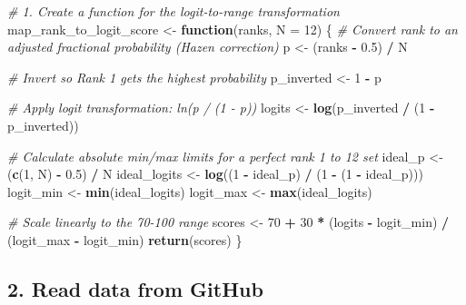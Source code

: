 \documentclass[
]{article}
\newenvironment{Shaded}{\begin{snugshade}}{\end{snugshade}}
\newcommand{\AttributeTok}[1]{\textcolor[rgb]{0.13,0.29,0.53}{#1}}
\newcommand{\CommentTok}[1]{\textcolor[rgb]{0.56,0.35,0.01}{\textit{#1}}}
\newcommand{\ControlFlowTok}[1]{\textcolor[rgb]{0.13,0.29,0.53}{\textbf{#1}}}
\newcommand{\DecValTok}[1]{\textcolor[rgb]{0.00,0.00,0.81}{#1}}
\newcommand{\FloatTok}[1]{\textcolor[rgb]{0.00,0.00,0.81}{#1}}
\newcommand{\FunctionTok}[1]{\textcolor[rgb]{0.13,0.29,0.53}{\textbf{#1}}}
\newcommand{\NormalTok}[1]{#1}
\newcommand{\OtherTok}[1]{\textcolor[rgb]{0.56,0.35,0.01}{#1}}
\newcommand{\SpecialCharTok}[1]{\textcolor[rgb]{0.81,0.36,0.00}{\textbf{#1}}}
\begin{document}
\begin{Shaded}
\begin{Highlighting}[]
\CommentTok{\# 1. Create a function for the logit{-}to{-}range transformation}
\NormalTok{map\_rank\_to\_logit\_score }\OtherTok{\textless{}{-}} \ControlFlowTok{function}\NormalTok{(ranks, }\AttributeTok{N =} \DecValTok{12}\NormalTok{) \{}
  \CommentTok{\# Convert rank to an adjusted fractional probability (Hazen correction)}
\NormalTok{  p }\OtherTok{\textless{}{-}}\NormalTok{ (ranks }\SpecialCharTok{{-}} \FloatTok{0.5}\NormalTok{) }\SpecialCharTok{/}\NormalTok{ N}

  \CommentTok{\# Invert so Rank 1 gets the highest probability}
\NormalTok{  p\_inverted }\OtherTok{\textless{}{-}} \DecValTok{1} \SpecialCharTok{{-}}\NormalTok{ p}

  \CommentTok{\# Apply logit transformation: ln(p / (1 {-} p))}
\NormalTok{  logits }\OtherTok{\textless{}{-}} \FunctionTok{log}\NormalTok{(p\_inverted }\SpecialCharTok{/}\NormalTok{ (}\DecValTok{1} \SpecialCharTok{{-}}\NormalTok{ p\_inverted))}

  \CommentTok{\# Calculate absolute min/max limits for a perfect rank 1 to 12 set}
\NormalTok{  ideal\_p }\OtherTok{\textless{}{-}}\NormalTok{ (}\FunctionTok{c}\NormalTok{(}\DecValTok{1}\NormalTok{, N) }\SpecialCharTok{{-}} \FloatTok{0.5}\NormalTok{) }\SpecialCharTok{/}\NormalTok{ N}
\NormalTok{  ideal\_logits }\OtherTok{\textless{}{-}} \FunctionTok{log}\NormalTok{((}\DecValTok{1} \SpecialCharTok{{-}}\NormalTok{ ideal\_p) }\SpecialCharTok{/}\NormalTok{ (}\DecValTok{1} \SpecialCharTok{{-}}\NormalTok{ (}\DecValTok{1} \SpecialCharTok{{-}}\NormalTok{ ideal\_p)))}
\NormalTok{  logit\_min }\OtherTok{\textless{}{-}} \FunctionTok{min}\NormalTok{(ideal\_logits)}
\NormalTok{  logit\_max }\OtherTok{\textless{}{-}} \FunctionTok{max}\NormalTok{(ideal\_logits)}

  \CommentTok{\# Scale linearly to the 70{-}100 range}
\NormalTok{  scores }\OtherTok{\textless{}{-}} \DecValTok{70} \SpecialCharTok{+} \DecValTok{30} \SpecialCharTok{*}\NormalTok{ (logits }\SpecialCharTok{{-}}\NormalTok{ logit\_min) }\SpecialCharTok{/}\NormalTok{ (logit\_max }\SpecialCharTok{{-}}\NormalTok{ logit\_min)}
  \FunctionTok{return}\NormalTok{(scores)}
\NormalTok{\}}
\end{Highlighting}
\end{Shaded}

\subsection{2. Read data from GitHub}\label{read-data-from-github}
\end{document}
